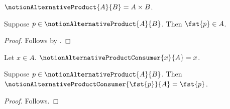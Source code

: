 

\begin{definition}\label{notion_alternative_product}
    $\notionAlternativeProduct{A}{B}=A\times B$.
\end{definition}

\begin{classification}\label{notion_alternative_product_fst_type}
    Suppose $p\in\notionAlternativeProduct{A}{B}$.
    Then $\fst{p}\in A$.
\end{classification}
\begin{proof}
    Follows by .
\end{proof}

\begin{definition}\label{notion_alternative_product_consumer}
    Let $x\in A$.
    $\notionAlternativeProductConsumer{x}{A}=x$.
\end{definition}

\begin{proposition}\label{notion_alternative_product_client}
    Suppose $p\in\notionAlternativeProduct{A}{B}$.
    Then $\notionAlternativeProductConsumer{\fst{p}}{A}=\fst{p}$.
\end{proposition}
\begin{proof}
    Follows.
\end{proof}
